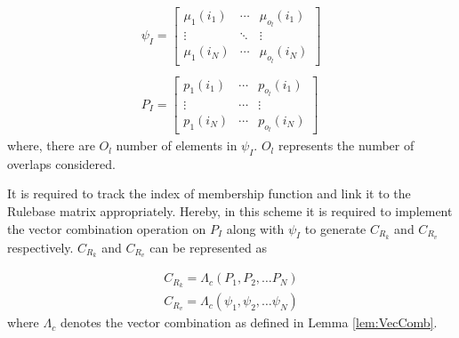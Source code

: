 \begin{equation} \label{eq:FRHC_OM2}
\begin{array}{l}
{\psi _I} = \left[ {\begin{array}{*{20}{c}}
	{{\mu _1}\left( {{i_1}} \right)}& \cdots &{{\mu _{{o_l}}}\left( {{i_1}} \right)}\\
	\vdots & \ddots & \vdots \\
	{{\mu _1}\left( {{i_N}} \right)}& \cdots &{{\mu _{{o_l}}}\left( {{i_N}} \right)}
	\end{array}} \right]\\~\\
{P_I} = \left[ {\begin{array}{*{20}{c}}
	{{p_1}\left( {{i_1}} \right)}& \cdots &{{p_{{o_l}}}\left( {{i_1}} \right)}\\
	\vdots & \cdots & \vdots \\
	{{p_1}\left( {{i_N}} \right)}& \cdots &{{p_{{o_l}}}\left( {{i_N}} \right)}
	\end{array}} \right]
\end{array}
\end{equation}
where, there are $ O_l $ number of elements in $ \psi _I $. $ O_l $ represents the number of overlaps considered.

It is required to track the index of membership function and link it to the Rulebase matrix appropriately. Hereby, in this scheme it is required to implement the vector combination operation on $ {P_I} $ along with $ {\psi _I} $ to generate $ C_{{R_k}} $ and $ C_{{R_v}} $ respectively. $ {C_{{R_k}}} $ and $ {C_{{R_v}}} $ can be represented as

\[\begin{array}{l}
{C_{{R_k}}} = {\Lambda _c}\left( {{P_1},{P_2}, \ldots {P_N}} \right)\\
{C_{{R_v}}} = {\Lambda _c}\left( {{\psi _1},{\psi _2}, \ldots {\psi _N}} \right)
\end{array}\]
where $ \Lambda _c $ denotes the vector combination as defined in Lemma \ref{lem:VecComb}.

